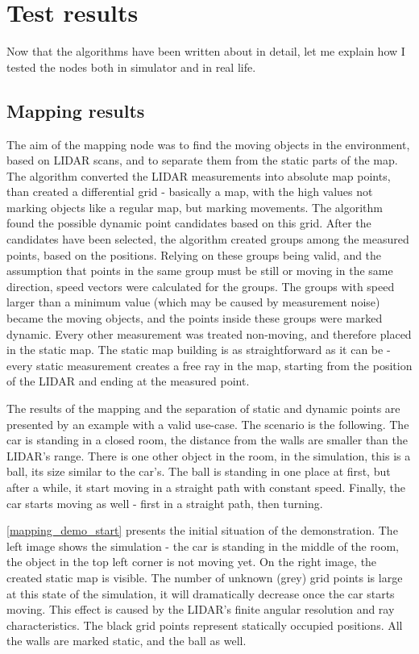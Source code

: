 \chapter{Test results}
\label{chap:test_results}

Now that the algorithms have been written about in detail, let me explain how I tested the nodes both in simulator and in real life.

\section{Mapping results}
The aim of the mapping node was to find the moving objects in the environment, based on LIDAR scans, and to separate them from the static parts of the map. The algorithm converted the LIDAR measurements into absolute map points, than created a differential grid - basically a map, with the high values not marking objects like a regular map, but marking movements. The algorithm found the possible dynamic point candidates based on this grid. After the candidates have been selected, the algorithm created groups among the measured points, based on the positions. Relying on these groups being valid, and the assumption that points in the same group must be still or moving in the same direction, speed vectors were calculated for the groups. The groups with speed larger than a minimum value (which may be caused by measurement noise) became the moving objects, and the points inside these groups were marked dynamic. Every other measurement was treated non-moving, and therefore placed in the static map. The static map building is as straightforward as it can be - every static measurement creates a free ray in the map, starting from the position of the LIDAR and ending at the measured point.

The results of the mapping and the separation of static and dynamic points are presented by an example with a valid use-case. The scenario is the following. The car is standing in a closed room, the distance from the walls are smaller than the LIDAR's range. There is one other object in the room, in the simulation, this is a ball, its size similar to the car's. The ball is standing in one place at first, but after a while, it start moving in a straight path with constant speed. Finally, the car starts moving as well - first in a straight path, then turning.

\ref{mapping_demo_start} presents the initial situation of the demonstration. The left image shows the simulation - the car is standing in the middle of the room, the object in the top left corner is not moving yet. On the right image, the created static map is visible. The number of unknown (grey) grid points is large at this state of the simulation, it will dramatically decrease once the car starts moving. This effect is caused by the LIDAR's finite angular resolution and ray characteristics. The black grid points represent statically occupied positions. All the walls are marked static, and the ball as well.

